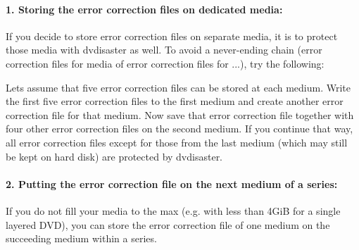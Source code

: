 \paragraph{1. Storing the error correction files on dedicated media:}\quad
\medskip

If you decide to store error correction files on separate media, it
is  to protect those media
with dvdisaster as well. To avoid a never-ending chain (error correction
files for media of error correction files for ...), try the following:

\smallskip

Lets assume that five error correction files can be stored at each medium.
Write the first five error correction files to the first medium and create
another error correction file for that medium. Now save that error correction
file together with four other error correction files on the second medium.
If you continue that way, all error correction files except for those from the
last medium (which may still be kept on hard disk) are protected by dvdisaster.

\paragraph{2. Putting the error correction file on the next medium of a series:}\quad
\medskip

If you do not fill your media to the max (e.g. with less than 4GiB for
a single layered DVD), you can store the error correction file of one
medium on the succeeding medium within a series.

 
